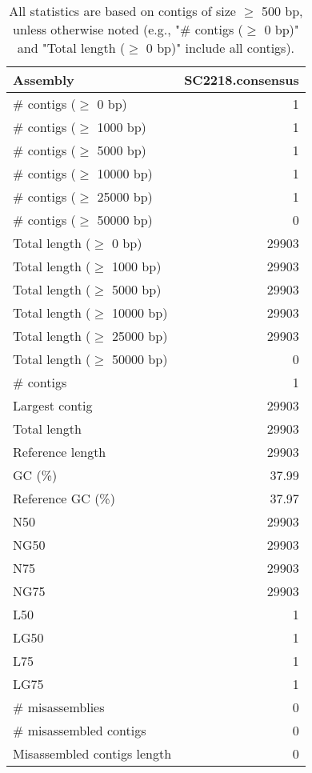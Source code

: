 \documentclass[12pt,a4paper]{article}
\begin{document}
\begin{table}[ht]
\begin{center}
\caption{All statistics are based on contigs of size $\geq$ 500 bp, unless otherwise noted (e.g., "\# contigs ($\geq$ 0 bp)" and "Total length ($\geq$ 0 bp)" include all contigs).}
\begin{tabular}{|l*{1}{|r}|}
\hline
Assembly & SC2218.consensus \\ \hline
\# contigs ($\geq$ 0 bp) & 1 \\ \hline
\# contigs ($\geq$ 1000 bp) & 1 \\ \hline
\# contigs ($\geq$ 5000 bp) & 1 \\ \hline
\# contigs ($\geq$ 10000 bp) & 1 \\ \hline
\# contigs ($\geq$ 25000 bp) & 1 \\ \hline
\# contigs ($\geq$ 50000 bp) & 0 \\ \hline
Total length ($\geq$ 0 bp) & 29903 \\ \hline
Total length ($\geq$ 1000 bp) & 29903 \\ \hline
Total length ($\geq$ 5000 bp) & 29903 \\ \hline
Total length ($\geq$ 10000 bp) & 29903 \\ \hline
Total length ($\geq$ 25000 bp) & 29903 \\ \hline
Total length ($\geq$ 50000 bp) & 0 \\ \hline
\# contigs & 1 \\ \hline
Largest contig & 29903 \\ \hline
Total length & 29903 \\ \hline
Reference length & 29903 \\ \hline
GC (\%) & 37.99 \\ \hline
Reference GC (\%) & 37.97 \\ \hline
N50 & 29903 \\ \hline
NG50 & 29903 \\ \hline
N75 & 29903 \\ \hline
NG75 & 29903 \\ \hline
L50 & 1 \\ \hline
LG50 & 1 \\ \hline
L75 & 1 \\ \hline
LG75 & 1 \\ \hline
\# misassemblies & 0 \\ \hline
\# misassembled contigs & 0 \\ \hline
Misassembled contigs length & 0 \\ \hline

\end{tabular}
\end{center}
\end{table}
\end{document}
